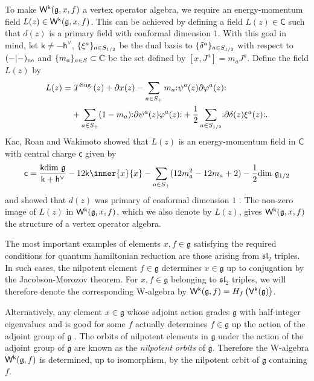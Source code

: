 \documentclass[10pt,a4paper]{amsart}
\numberwithin{equation}{section}
\newcommand{\pd}{\partial}     %
\newcommand{\cc}{\mathsf{c}}   %
\newcommand{\kk}{\mathsf{k}}   %
\DeclarePairedDelimiter{\brac}{\lparen}{\rparen}   %
\DeclarePairedDelimiter{\set}{\lbrace}{\rbrace}
\newcommand{\no}[1]{\mathopen{:} #1 \mathclose{:}} %
\newcommand{\blank}{{-}}
\newcommand{\fld}[1]{\mathbb{#1}}    %
\newcommand{\alg}[1]{\mathfrak{#1}}  %
\newcommand{\VOA}[1]{\mathsf{#1}}    %
\newcommand{\CC}{\fld{C}}
\newcommand{\SLA}[2]{\alg{#1}_{#2}}                      %
\newcommand{\sltwo}{\SLA{sl}{2}}
\newcommand{\cox}{\mathsf{h}}                                        %
\newcommand{\dcox}{\coroot{\cox}}                                    %
\newcommand{\coroot}[1]{#1^{\vee}}                                   %
\newcommand{\Wsymb}{\VOA{W}}
\newcommand{\uaffvoa}[2]{\VOA{V}^{#1}\brac{#2}}                   %
\newcommand{\uQHR}[3]{\Wsymb^{#1}\brac{#2,#3}}                    %
\theoremstyle{plain}
\begin{document}
To make $\uQHR{\kk}{\mathfrak{g}}{x,f}$ a vertex operator algebra, we require an energy-momentum field $L(z) \in \uQHR{\kk}{\mathfrak{g}}{x,f}$. This can be achieved by defining a field $L(z) \in \VOA{C}$ such that $d(z)$ is a primary field with conformal dimension $1$. With this goal in mind, let $\kk \neq - \dcox$, $\set{\xi^a}_{a \in S_{1/2}}$ be the dual basis to $\set{\delta^a}_{a \in S_{1/2}}$ with respect to $(\blank | \blank)_{\textup{ne}}$ and $\set{m_a}_{a \in S} \subset \CC$ be the set defined by $[x,J^a] = m_a J^a$. Define the field $L(z)$ by
%
\begin{align} \label{eq:Walgemfield}
    L(z) =&\ T^{\text{Sug.}}(z) + \pd x(z)
    - \sum_{a \in S_+} m_a \no{\psi^a(z) \pd \varphi^a(z)} \\&+\sum_{a \in S_+} (1-m_a) \no{\pd \psi^a(z) \varphi^a(z)}
    + \frac{1}{2}\sum_{a \in S_{1/2}} \no{\pd \delta(z)\xi^a(z)}. \notag
\end{align}
%
Kac, Roan and Wakimoto showed that $L(z)$ is an energy-momentum field in $\VOA{C}$ with central charge $\cc$ given by \cite[Thm.~2.2(a)]{KacQua03}
%
\begin{equation}
    \cc = \frac{\kk \textup{dim }\mathfrak{g}}{\kk+\dcox} - 12 \kk \inner{x}{x} - \sum_{a \in S_+} (12 m_a^2 - 12m_a + 2) - \frac{1}{2}\textup{dim }\mathfrak{g}_{1/2}
\end{equation}
%
and showed that $d(z)$ was primary of conformal dimension $1$ \cite[Thm.~2.3]{KacQua03}. The non-zero image of $L(z)$ in $\uQHR{\kk}{\mathfrak{g}}{x,f}$, which we also denote by $L(z)$, gives $\uQHR{\kk}{\mathfrak{g}}{x,f}$ the structure of a vertex operator algebra.

The most important examples of elements $x,f \in \mathfrak{g}$ satisfying the required conditions for quantum hamiltonian reduction are those arising from $\sltwo$ triples. In such cases, the nilpotent element $f \in \mathfrak{g}$ determines $x \in \mathfrak{g}$ up to conjugation by the Jacobson-Morozov theorem. For $x,f \in \mathfrak{g}$ belonging to $\sltwo$ triples, we will therefore denote the corresponding W-algebra by $\uQHR{\kk}{\mathfrak{g}}{f} =  H_{f}\left(\uaffvoa{\kk}{\mathfrak{g}} \right)$.

Alternatively, any element $x \in \mathfrak{g}$ whose adjoint action grades $\mathfrak{g}$ with half-integer eigenvalues and is good for some $f$ actually determines $f \in \mathfrak{g}$ up the action of the adjoint group of $\mathfrak{g}$ \cite[Rem.~1.1]{KacQua04}. The orbits of nilpotent elements in $\mathfrak{g}$ under the action of the adjoint group of $\mathfrak{g}$ are known as the \emph{nilpotent orbits} of $\mathfrak{g}$. Therefore the W-algebra $\uQHR{\kk}{\mathfrak{g}}{f}$ is determined, up to isomorphism, by the nilpotent orbit of $\mathfrak{g}$ containing $f$.
\end{document}
